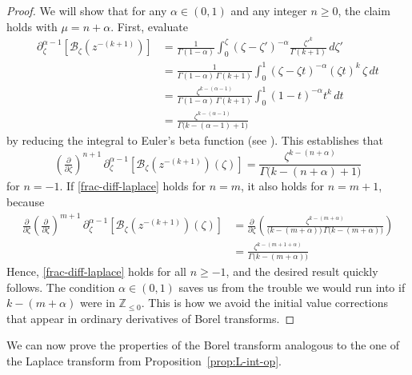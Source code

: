 \documentclass{article}
\newcommand{\Z}{\mathbb{Z}}
\newcommand{\borel}{\mathcal{B}}
\theoremstyle{definition}
\theoremstyle{plain}
\begin{document}
\begin{proof}
We will show that for any $\alpha \in (0, 1)$ and any integer $n \ge 0$, the claim holds with $\mu = n + \alpha$. First, evaluate
\begin{align*}
\partial^{\alpha-1}_{\zeta} \left[ \borel_\zeta \left(z^{-(k+1)}\right) \right] & = \frac{1}{\Gamma(1-\alpha)} \int_0^\zeta (\zeta-\zeta')^{-\alpha} \frac{{\zeta'}^k}{\Gamma(k+1)}\,d\zeta' \\
& = \frac{1}{\Gamma(1-\alpha)\,\Gamma(k+1)} \int_0^1 (\zeta-\zeta t)^{-\alpha} (\zeta t)^k\,\zeta\,dt \\
& = \frac{\zeta^{k-(\alpha-1)}}{\Gamma(1-\alpha)\,\Gamma(k+1)} \int_0^1 (1-t)^{-\alpha} t^k\,dt \\
& = \frac{\zeta^{k-(\alpha-1)}}{\Gamma\big(k-(\alpha-1)+1\big)}
\end{align*}
by reducing the integral to Euler's beta function (see \cite[Identity 5.12.1]{dlmf}). This establishes that
\begin{equation}\label{frac-diff-laplace}
\left(\tfrac{\partial}{\partial \zeta}\right)^{n+1}\,\partial^{\alpha-1}_{\zeta } \left[ \borel_\zeta \left(z^{-(k+1)}\right)(\zeta) \right] = \frac{\zeta^{k-(n+\alpha)}}{\Gamma\big(k-(n+\alpha)+1\big)}
\end{equation}
for $n = -1$. If \eqref{frac-diff-laplace} holds for $n = m$, it also holds for $n = m+1$, because
\begin{align*}
\tfrac{\partial}{\partial \zeta} \left(\tfrac{\partial}{\partial \zeta}\right)^{m+1}\,\partial^{\alpha-1}_{\zeta} \left[ \borel_\zeta \left(z^{-(k+1)}\right)(\zeta) \right] & = \tfrac{\partial}{\partial \zeta} \left( \frac{\zeta^{k-(m+\alpha)}}{\big(k-(m+\alpha)\big)\,\Gamma\big(k-(m+\alpha)\big)} \right) \\
& = \frac{\zeta^{k-(m+1+\alpha)}}{\Gamma\big(k-(m+\alpha)\big)}
\end{align*}
Hence, \eqref{frac-diff-laplace} holds for all $n \ge -1$, and the desired result quickly follows. The condition $\alpha \in (0, 1)$ saves us from the trouble we would run into if $k-(m+\alpha)$ were in $\Z_{\le 0}$. This is how we avoid the initial value corrections that appear in ordinary derivatives of Borel transforms.
\end{proof}
We can now prove the properties of the Borel transform analogous to the one of the Laplace transform from Proposition~\ref{prop:L-int-op}.
\end{document}

